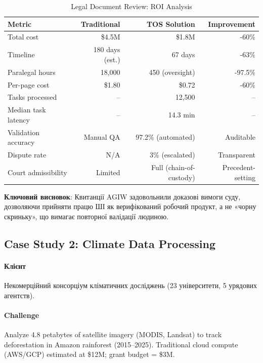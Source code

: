 \documentclass[11pt]{article}
\begin{document}
\begin{table}[H]
\centering
\caption{Legal Document Review: ROI Analysis}
\label{tab:legal-roi}
\begin{tabular}{@{}lrrr@{}}
\toprule
\textbf{Metric} & \textbf{Traditional} & \textbf{TOS Solution} & \textbf{Improvement} \\ \midrule
Total cost & \$4.5M & \$1.8M & -60\% \\
Timeline & 180 days (est.) & 67 days & -63\% \\
Paralegal hours & 18,000 & 450 (oversight) & -97.5\% \\
Per-page cost & \$1.80 & \$0.72 & -60\% \\
Tasks processed & -- & 12,500 & -- \\
Median task latency & -- & 14.3 min & -- \\
Validation accuracy & Manual QA & 97.2\% (automated) & Auditable \\
Dispute rate & N/A & 3\% (escalated) & Transparent \\
Court admissibility & Limited & Full (chain-of-custody) & Precedent-setting \\
\bottomrule
\end{tabular}
\end{table}

\textbf{Ключовий висновок}: Квитанції AGIW задовольнили доказові вимоги суду, дозволяючи прийняти працю ШІ як верифікований робочий продукт, а не «чорну скриньку», що вимагає повторної валідації людиною.

\subsection{Case Study 2: Climate Data Processing}

\paragraph{Клієнт} Некомерційний консорціум кліматичних досліджень (23 університети, 5 урядових агентств).

\paragraph{Challenge} Analyze 4.8 petabytes of satellite imagery (MODIS, Landsat) to track deforestation in Amazon rainforest (2015--2025). Traditional cloud compute (AWS/GCP) estimated at \$12M; grant budget = \$3M.
\end{document}
